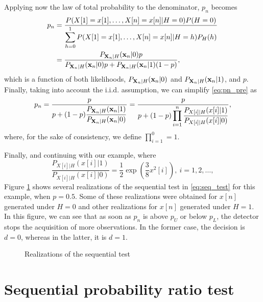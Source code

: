 Applying now the law of total probability to the denominator, $p_n$ becomes
\begin{align}
	p_n &= \frac{P(X[1] = x[1], \ldots, X[n] = x[n] | H = 0) P(H = 0)}{\displaystyle \sum_{h = 0}^{1} P(X[1] = x[1], \ldots, X[n] = x[n] | H = h) P_H(h)} \nonumber \\ &= 
	\frac{P_{\mathbf{X}_n | H}({\mathbf x}_n | 0) p}{P_{\mathbf{X}_n | H}({\mathbf x}_n | 0) p + P_{\mathbf{X}_n | H}({\mathbf x}_n | 1) (1 - p)}, \label{eq:pn_pre}
\end{align}
which is a function of both likelihoods, $P_{\mathbf{X}_n | H}({\mathbf x}_n | 0)$ and $P_{\mathbf{X}_n | H}({\mathbf x}_n | 1)$, and $p$. Finally, taking into account the i.i.d. assumption, we can simplify \eqref{eq:pn_pre} as
\begin{equation}
	\label{eq:pn}
	p_n = \frac{p}{\displaystyle p +  (1 - p) \frac{P_{\mathbf{X}_n | H}({\mathbf x}_n | 1)}{P_{\mathbf{X}_n | H}({\mathbf x}_n | 0)}} = \frac{p}{\displaystyle p +  (1 - p) \prod_{i = 1}^{n} \frac{P_{X[i] | H}(x[i] | 1)}{P_{X[i] | H}(x[i] | 0)}},
\end{equation}
where, for the sake of consistency, we define $\prod_{i = 1}^{0} = 1$.

Finally, and continuing with our example, where
\begin{equation*}
	\frac{P_{X[i] | H}(x[i] | 1)}{P_{X[i] | H}(x[i] | 0)} = \frac{1}{2} \exp \left(\frac{3 }{8} x^2[i] \right), \ i = 1, 2, \ldots,
\end{equation*}
Figure \ref{fig:seq_test_realizations} shows several realizations of the sequential test in \eqref{eq:seq_test} for this example, when $p = 0.5$. Some of these realizations were obtained for $x[n]$ generated under $H = 0$ and other realizations for  $x[n]$ generated under $H = 1$. In this figure, we can see that as soon as $p_n$ is above $p_U$ or below $p_L$, the detector stops the acquisition of more observations. In the former case, the decision is $d = 0$, whereas in the latter, it is $d = 1$.
\begin{figure}[t]
	\begin{center}
		
	\end{center}
	\caption{Realizations of the sequential test}
	\label{fig:seq_test_realizations}
\end{figure}

\section{Sequential probability ratio test}

